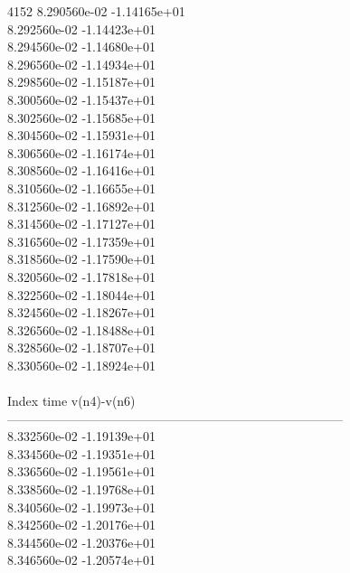 4152	8.290560e-02	-1.14165e+01	\\ 	8.292560e-02	-1.14423e+01	\\ 	8.294560e-02	-1.14680e+01	\\ 	8.296560e-02	-1.14934e+01	\\ 	8.298560e-02	-1.15187e+01	\\ 	8.300560e-02	-1.15437e+01	\\ 	8.302560e-02	-1.15685e+01	\\ 	8.304560e-02	-1.15931e+01	\\ 	8.306560e-02	-1.16174e+01	\\ 	8.308560e-02	-1.16416e+01	\\ 	8.310560e-02	-1.16655e+01	\\ 	8.312560e-02	-1.16892e+01	\\ 	8.314560e-02	-1.17127e+01	\\ 	8.316560e-02	-1.17359e+01	\\ 	8.318560e-02	-1.17590e+01	\\ 	8.320560e-02	-1.17818e+01	\\ 	8.322560e-02	-1.18044e+01	\\ 	8.324560e-02	-1.18267e+01	\\ 	8.326560e-02	-1.18488e+01	\\ 	8.328560e-02	-1.18707e+01	\\ 	8.330560e-02	-1.18924e+01	\\ \hline
\\ \hline
Index   time            v(n4)-v(n6)     \\ \hline
--------------------------------------------------------------------------------\\ 	8.332560e-02	-1.19139e+01	\\ 	8.334560e-02	-1.19351e+01	\\ 	8.336560e-02	-1.19561e+01	\\ 	8.338560e-02	-1.19768e+01	\\ 	8.340560e-02	-1.19973e+01	\\ 	8.342560e-02	-1.20176e+01	\\ 	8.344560e-02	-1.20376e+01	\\ 	8.346560e-02	-1.20574e+01	\\ \hline
